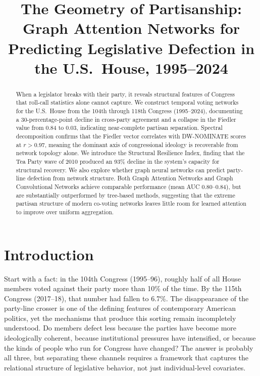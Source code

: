 \documentclass[11pt]{article}
\title{\textbf{The Geometry of Partisanship: \\Graph Attention Networks for Predicting Legislative Defection in the U.S.\ House, 1995--2024}}
\author{}
\date{}
\begin{document}
\maketitle

\begin{abstract}
When a legislator breaks with their party, it reveals structural features of Congress that roll-call statistics alone cannot capture. We construct temporal voting networks for the U.S.\ House from the 104th through 118th Congress (1995--2024), documenting a 30-percentage-point decline in cross-party agreement and a collapse in the Fiedler value from 0.84 to 0.03, indicating near-complete partisan separation. Spectral decomposition confirms that the Fiedler vector correlates with DW-NOMINATE scores at $r > 0.97$, meaning the dominant axis of congressional ideology is recoverable from network topology alone. We introduce the Structural Resilience Index, finding that the Tea Party wave of 2010 produced an 93\% decline in the system's capacity for structural recovery. We also explore whether graph neural networks can predict party-line defection from network structure. Both Graph Attention Networks and Graph Convolutional Networks achieve comparable performance (mean AUC 0.80--0.84), but are substantially outperformed by tree-based methods, suggesting that the extreme partisan structure of modern co-voting networks leaves little room for learned attention to improve over uniform aggregation.
\end{abstract}

\section{Introduction}

Start with a fact: in the 104th Congress (1995--96), roughly half of all House members voted against their party more than 10\% of the time. By the 115th Congress (2017--18), that number had fallen to 6.7\%. The disappearance of the party-line crosser is one of the defining features of contemporary American politics, yet the mechanisms that produce this sorting remain incompletely understood. Do members defect less because the parties have become more ideologically coherent, because institutional pressures have intensified, or because the kinds of people who run for Congress have changed? The answer is probably all three, but separating these channels requires a framework that captures the relational structure of legislative behavior, not just individual-level covariates.
\end{document}
